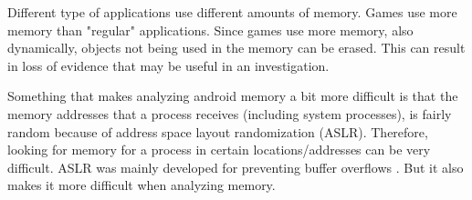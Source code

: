 Different type of applications use different amounts of memory. Games use more memory than "regular" applications.
Since games use more memory, also dynamically, objects not being used in the memory can be erased. This can result in
loss of evidence that may be useful in an investigation.

Something that makes analyzing android memory a bit more difficult is that the memory addresses that a process
receives (including system processes), is fairly random because of address space layout randomization (ASLR). Therefore, looking for memory for a process in certain locations/addresses can be very difficult.
ASLR was mainly developed for preventing buffer overflows \cite{prot_aslr}. But it also makes it more difficult when analyzing memory.





%
%

